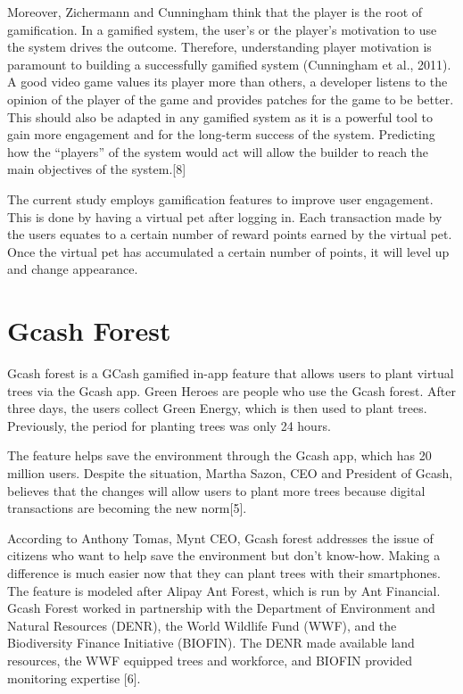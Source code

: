 Moreover, Zichermann and Cunningham think that the player is the root of
gamification. In a gamified system, the user’s or the player’s motivation to use
the system drives the outcome. Therefore, understanding player motivation is
paramount to building a successfully gamified system (Cunningham et al., 2011).
A good video game values its player more than others, a developer listens to the
opinion of the player of the game and provides patches for the game to be better.
This should also be adapted in any gamified system as it is a powerful tool to gain more engagement and for the long-term success of the system. Predicting how
the “players” of the system would act will allow the builder to reach the main
objectives of the system.[8]

The current study employs gamification features to improve user engagement.
This is done by having a virtual pet after logging in. Each
transaction made by the users equates to a certain number of reward points earned
by the virtual pet. Once the virtual pet has accumulated a certain number of
points, it will level up and change appearance.

\section{Gcash Forest}

Gcash forest is a GCash gamified in-app feature that allows users to plant
virtual trees via the Gcash app. Green Heroes are people who use the Gcash
forest. After three days, the users collect Green Energy, which is then used to
plant trees. Previously, the period for planting trees was only 24 hours.

The feature helps save the environment through the Gcash app, which
has 20 million users. Despite the situation, Martha Sazon, CEO and President
of Gcash, believes that the changes will allow users to plant more trees because
digital transactions are becoming the new norm[5].

According to Anthony Tomas, Mynt CEO, Gcash forest addresses the issue of
citizens who want to help save the environment but don’t know-how. Making a
difference is much easier now that they can plant trees with their smartphones.
The feature is modeled after Alipay Ant Forest, which is run by Ant Financial.
Gcash Forest worked in partnership with the Department of Environment and
Natural Resources (DENR), the World Wildlife Fund (WWF), and the Biodiversity
Finance Initiative (BIOFIN). The DENR made available land resources, the
WWF equipped trees and workforce, and BIOFIN provided monitoring expertise
[6].

